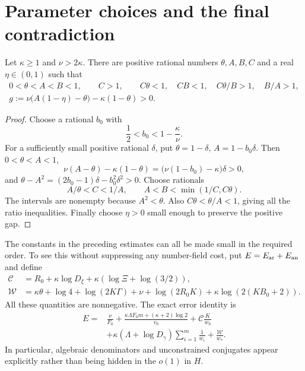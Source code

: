 \section{Parameter choices and the final contradiction}
\label{sec:parameters}

\begin{lemma}\label{lem:gap}
Let \(\kappa\ge1\) and \(\nu>2\kappa\). There are positive
rational numbers \(\theta,A,B,C\) and a real \(\eta\in(0,1)\)
such that
\begin{gather}
 0<\theta<A<B<1,\qquad C>1,\qquad
 C\theta<1,\quad CB<1,\quad C\theta/B>1,\quad B/A>1,
 \label{eq:parameter-ratios}\\
 g:=\nu\bigl(A(1-\eta)-\theta\bigr)-\kappa(1-\theta)>0.
 \label{eq:gap}
\end{gather}
\end{lemma}
\begin{proof}
Choose a rational \(b_0\) with
\[
 \frac12<b_0<1-\frac{\kappa}{\nu}.
\]
For a sufficiently small positive rational \(\delta\), put
\(\theta=1-\delta\), \(A=1-b_0\delta\). Then \(0<\theta<A<1\),
\[
 \nu(A-\theta)-\kappa(1-\theta)
     =\bigl(\nu(1-b_0)-\kappa\bigr)\delta>0,
\]
and
\(\theta-A^2=(2b_0-1)\delta-b_0^2\delta^2>0\).
Choose rationals
\[
 A/\theta<C<1/A,\qquad A<B<\min(1/C,C\theta).
\]
The intervals are nonempty because \(A^2<\theta\).
Also \(C\theta<\theta/A<1\), giving all the ratio inequalities.
Finally choose \(\eta>0\) small enough to preserve the positive gap.
\end{proof}

The constants in the preceding estimates can all be made small in the
required order. To see this without suppressing any number-field cost,
put \(E=E_{\rm ar}+E_{\rm an}\) and define
\[
 \begin{split}
 \mathcal C&=R_0+\kappa\log D_\xi+
                    \kappa(\log\Xi+\log(3/2)),\\
 \mathcal W&=\kappa\theta+\log4+\log(2K\Gamma)+\nu
       +\log(2R_0K)+\kappa\log(2(KB_0+2)).
 \end{split}
\]
All these quantities are nonnegative. The exact error identity is
\begin{equation}\label{eq:error-ledger}
 \begin{split}
 E={}&\frac{\nu}{F_0}
   +\frac{\kappa\Lambda F_0m+(\kappa+2)\log2}{v_0}
   +\mathcal C\frac K{w_0}\\
   &+\kappa(\Lambda+\log D_\gamma)\sum_{i=1}^m\frac1{w_i}
     +\frac{\mathcal W}{w_*}.
 \end{split}
\end{equation}
In particular, algebraic denominators and unconstrained conjugates
appear explicitly rather than being hidden in the \(o(1)\) in \(H\).

